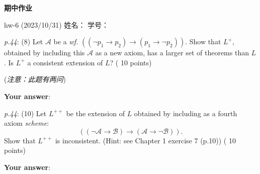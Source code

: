 \documentclass[UTF8,12pt,a4paper]{ctexart}
\begin{document}
	
	\begin{center}
	{\Large 	\textbf{期中作业}}
	\end{center}

\begin{center}
hw-6 (2023/10/31) \qquad\qquad 姓名：  \hspace{7em}  学号： 
\end{center}

\emph{p.44}: (8) \quad
Let $\mathscr{A}$ be a \textit{wf.} $((\neg p_1 \to p_2) \to (p_1 \to \neg p_2))$. 
Show that $L^+$, obtained by including this $\mathscr{A}$ as a new axiom, has a larger set of theorems than $L$. Is $L^+$ a consistent extension of $L$?
\hfill ({\color{purple} 10 points})

(\textit{注意：此题有两问})

\textbf{Your answer}:












\vspace{12cm}  %


\emph{p.44}: (10) \quad
Let $L^{++}$ be the extension of $L$ obtained by including as a fourth axiom \textit{scheme}:
\[
( (\neg \mathscr{A} \to \mathscr{B}) \to (\mathscr{A} \to \neg \mathscr{B})).
\]
Show that $L^{++}$ is inconsistent. (Hint: see Chapter 1 exercise 7 (p.10)) 
\hfill ({\color{purple} 10 points})

\textbf{Your answer}:





















\end{document}
